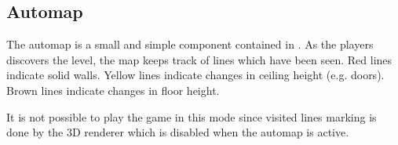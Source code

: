 \subsection{Automap}
The automap is a small and simple component contained in . As the players discovers the level, the map keeps track of lines which have been seen. Red lines indicate solid walls. Yellow lines indicate changes in ceiling height (e.g. doors). Brown lines indicate changes in floor height.\\
\par
It is not possible to play the game in this mode since visited lines marking is done by the 3D renderer which is disabled when the automap is active.\\
\par
{}
\par
{}\\
\par
{}\\
\par
